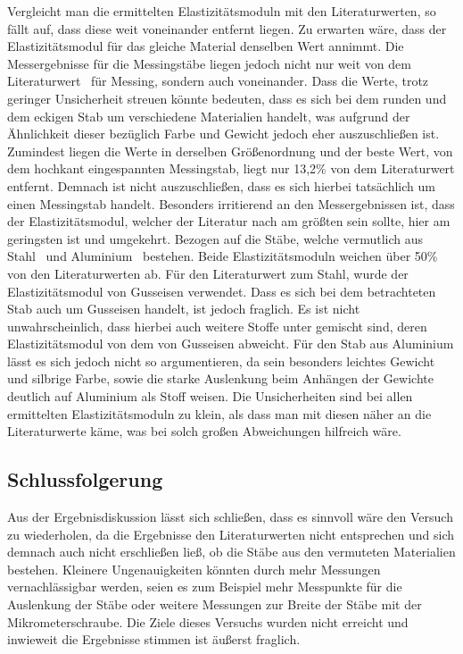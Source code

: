 \documentclass[11pt,a4paper,titlepage, ngerman]{article}
\begin{document}
		Vergleicht man die ermittelten Elastizitätsmoduln mit den Literaturwerten, so fällt auf, dass diese weit voneinander entfernt liegen.
		Zu erwarten wäre, dass der Elastizitätsmodul für das gleiche Material denselben Wert annimmt. Die Messergebnisse für die Messingstäbe liegen jedoch nicht nur weit von dem Literaturwert~\cite{1} für Messing, sondern auch voneinander. Dass die Werte, trotz geringer Unsicherheit streuen könnte bedeuten, dass es sich bei dem runden und dem eckigen Stab um verschiedene Materialien handelt, was aufgrund der Ähnlichkeit dieser bezüglich Farbe und Gewicht jedoch eher auszuschließen ist. Zumindest liegen die Werte in derselben Größenordnung und der \glqq beste\grqq {} Wert, von dem hochkant eingespannten Messingstab, liegt nur 13,2\% von dem Literaturwert entfernt. Demnach ist nicht auszuschließen, dass es sich hierbei tatsächlich um einen Messingstab handelt.
		Besonders irritierend an den Messergebnissen ist, dass der Elastizitätsmodul, welcher der Literatur nach am größten sein sollte, hier am geringsten ist und umgekehrt. Bezogen auf die Stäbe, welche vermutlich aus Stahl~\cite{2} und Aluminium~\cite{3} bestehen. Beide Elastizitätsmoduln weichen über 50\% von den Literaturwerten ab. Für den Literaturwert zum Stahl, wurde der Elastizitätsmodul von Gusseisen verwendet. Dass es sich bei dem betrachteten Stab auch um Gusseisen handelt, ist jedoch fraglich. Es ist nicht unwahrscheinlich, dass hierbei auch weitere Stoffe unter gemischt sind, deren Elastizitätsmodul von dem von Gusseisen abweicht.
		Für den Stab aus Aluminium lässt es sich jedoch nicht so argumentieren, da sein besonders leichtes Gewicht und silbrige Farbe, sowie die starke Auslenkung beim Anhängen der Gewichte deutlich auf Aluminium als Stoff weisen.
		Die Unsicherheiten sind bei allen ermittelten Elastizitätsmoduln zu klein, als dass man mit diesen näher an die Literaturwerte käme, was bei solch großen Abweichungen hilfreich wäre.
		
	\subsection{Schlussfolgerung}
		
		Aus der Ergebnisdiskussion lässt sich schließen, dass es sinnvoll wäre den Versuch zu wiederholen, da die Ergebnisse den Literaturwerten nicht entsprechen und sich demnach auch nicht erschließen ließ, ob die Stäbe aus den vermuteten Materialien bestehen. Kleinere Ungenauigkeiten könnten durch mehr Messungen vernachlässigbar werden, seien es zum Beispiel mehr Messpunkte für die Auslenkung der Stäbe oder weitere Messungen zur Breite der Stäbe mit der Mikrometerschraube. Die Ziele dieses Versuchs wurden nicht erreicht und inwieweit die Ergebnisse stimmen ist äußerst fraglich. 
	
	\printbibliography
\end{document}
